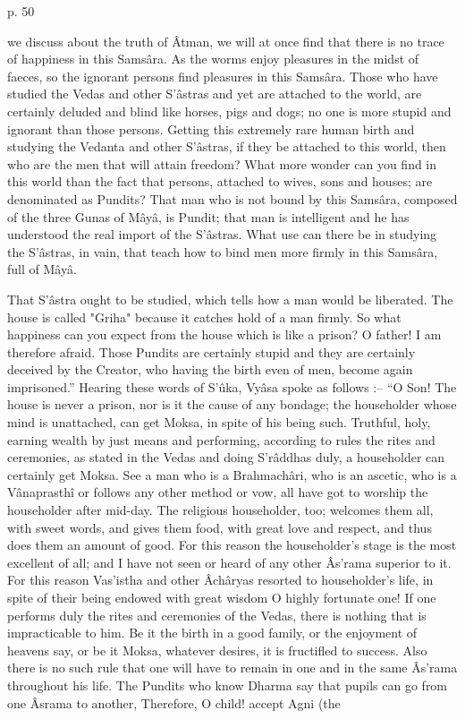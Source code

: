 

p. 50

 

we discuss about the truth of Âtman, we will at once find that there is no trace of happiness in this Samsâra. As the worms enjoy pleasures in the midst of faeces, so the ignorant persons find pleasures in this Samsâra. Those who have studied the Vedas and other S’âstras and yet are attached to the world, are certainly deluded and blind like horses, pigs and dogs; no one is more stupid and ignorant than those persons. Getting this extremely rare human birth and studying the Vedanta and other S’âstras, if they be attached to this world, then who are the men that will attain freedom? What more wonder can you find in this world than the fact that persons, attached to wives, sons and houses; are denominated as Pundits? That man who is not bound by this Samsâra, composed of the three Gunas of Mâyâ, is Pundit; that man is intelligent and he has understood the real import of the S’âstras. What use can there be in studying the S’âstras, in vain, that teach how to bind men more firmly in this Samsâra, full of Mâyâ.

 

That S’âstra ought to be studied, which tells how a man would be liberated. The house is called "Griha" because it catches hold of a man firmly. So what happiness can you expect from the house which is like a prison? O father! I am therefore afraid. Those Pundits are certainly stupid and they are certainly deceived by the Creator, who having the birth even of men, become again imprisoned.” Hearing these words of S’ûka, Vyâsa spoke as follows :-- “O Son! The house is never a prison, nor is it the cause of any bondage; the householder whose mind is unattached, can get Moksa, in spite of his being such. Truthful, holy, earning wealth by just means and performing, according to rules the rites and ceremonies, as stated in the Vedas and doing S'râddhas duly, a householder can certainly get Moksa. See a man who is a Brahmachâri, who is an ascetic, who is a Vânaprasthî or follows any other method or vow, all have got to worship the householder after mid-day. The religious householder, too; welcomes them all, with sweet words, and gives them food, with great love and respect, and thus does them an amount of good. For this reason the householder's stage is the most excellent of all; and I have not seen or heard of any other Âs'rama superior to it. For this reason Vas'istha and other Âchâryas resorted to householder's life, in spite of their being endowed with great wisdom O highly fortunate one! If one performs duly the rites and ceremonies of the Vedas, there is nothing that is impracticable to him. Be it the birth in a good family, or the enjoyment of heavens say, or be it Moksa, whatever desires, it is fructifled to success. Also there is no such rule that one will have to remain in one and in the same Âs'rama throughout his life. The Pundits who know Dharma say that pupils can go from one Âsrama to another, Therefore, O child! accept Agni (the

